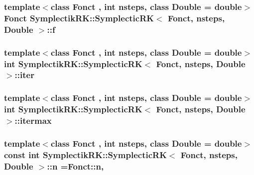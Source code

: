 \hypertarget{classSymplectikRK_1_1SymplecticRK_a321ad75248441c547cec8ba6a135af30}{
\subsubsection[{f}]{\setlength{\rightskip}{0pt plus 5cm}template$<$class Fonct , int nsteps, class Double  = double$>$ Fonct {\bf Symplectik\-R\-K\-::\-Symplectic\-R\-K}$<$ Fonct, nsteps, Double $>$\-::f\hspace{0.3cm}{\ttfamily [private]}}}\label{classSymplectikRK_1_1SymplecticRK_a321ad75248441c547cec8ba6a135af30}
\hypertarget{classSymplectikRK_1_1SymplecticRK_a6926fcbafe39839cc444137fa44cd45c}{
\subsubsection[{iter}]{\setlength{\rightskip}{0pt plus 5cm}template$<$class Fonct , int nsteps, class Double  = double$>$ int {\bf Symplectik\-R\-K\-::\-Symplectic\-R\-K}$<$ Fonct, nsteps, Double $>$\-::iter\hspace{0.3cm}{\ttfamily [private]}}}\label{classSymplectikRK_1_1SymplecticRK_a6926fcbafe39839cc444137fa44cd45c}
\hypertarget{classSymplectikRK_1_1SymplecticRK_adbc39fbdd317f2f1e357620fd1301ef9}{
\subsubsection[{itermax}]{\setlength{\rightskip}{0pt plus 5cm}template$<$class Fonct , int nsteps, class Double  = double$>$ int {\bf Symplectik\-R\-K\-::\-Symplectic\-R\-K}$<$ Fonct, nsteps, Double $>$\-::itermax\hspace{0.3cm}{\ttfamily [private]}}}\label{classSymplectikRK_1_1SymplecticRK_adbc39fbdd317f2f1e357620fd1301ef9}
\hypertarget{classSymplectikRK_1_1SymplecticRK_a813ae8b9778880235af9ed0d9ad08b36}{
\subsubsection[{n}]{\setlength{\rightskip}{0pt plus 5cm}template$<$class Fonct , int nsteps, class Double  = double$>$ const int {\bf Symplectik\-R\-K\-::\-Symplectic\-R\-K}$<$ Fonct, nsteps, Double $>$\-::n =Fonct\-::n\hspace{0.3cm}{\ttfamily [static]}, {\ttfamily [private]}}}\label{classSymplectikRK_1_1SymplecticRK_a813ae8b9778880235af9ed0d9ad08b36}
